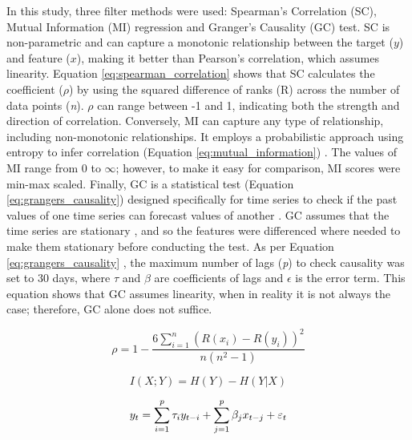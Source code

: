 \documentclass[ %
                    author={Raj Dhakan},
                supervisor={Dr. Ayush Joshi},
                    degree={MSc},
                     title={Ethereum Price Prediction using Internal and External Factors},
                  subtitle={},
                      type={},
                      year={2025}]{dissertation}
\begin{document}
In this study, three filter methods were used: Spearman's Correlation (SC), Mutual Information (MI) regression and Granger's Causality (GC) test. SC is non-parametric and can capture a monotonic relationship between the target ($y$) and feature ($x$), making it better than Pearson's correlation, which assumes linearity. Equation \ref{eq:spearman_correlation} shows that SC calculates the coefficient ($\rho$) by using the squared difference of ranks (R) across the number of data points (\textit{n}). $\rho$ can range between -1 and 1, indicating both the strength and direction of correlation. Conversely, MI can capture any type of relationship, including non-monotonic relationships. It employs a probabilistic approach using entropy to infer correlation (Equation \ref{eq:mutual_information}) \cite{beraha2019feature}. The values of MI range from 0 to $\infty$; however, to make it easy for comparison, MI scores were min-max scaled. Finally, GC is a statistical test (Equation \ref{eq:grangers_causality}) designed specifically for time series to check if the past values of one time series can forecast values of another \cite{shojaie2022granger}. GC assumes that the time series are stationary \cite{shojaie2022granger}, and so the features were differenced where needed to make them stationary before conducting the test. As per Equation \ref{eq:grangers_causality} \cite{shojaie2022granger}, the maximum number of lags (\textit{p}) to check causality was set to 30 days, where $\tau$ and $\beta$ are coefficients of lags and $\epsilon$ is the error term. This equation shows that GC assumes linearity, when in reality it is not always the case; therefore, GC alone does not suffice. 

\begin{equation}
\label{eq:spearman_correlation}
\rho = 1 - \frac{6 \sum_{i=1}^{n} (R(x_i)-R(y_i))^2}{n(n^2 - 1)}
\end{equation}

\begin{equation}
\label{eq:mutual_information}
I(X; Y) = H(Y) - H(Y|X)
\end{equation}

\begin{equation}
\label{eq:grangers_causality}
y_t = \sum_{i=1}^p \tau_i y_{t-i} + \sum_{j=1}^p \beta_j x_{t-j} + \varepsilon_t \\
\end{equation}
\end{document}
